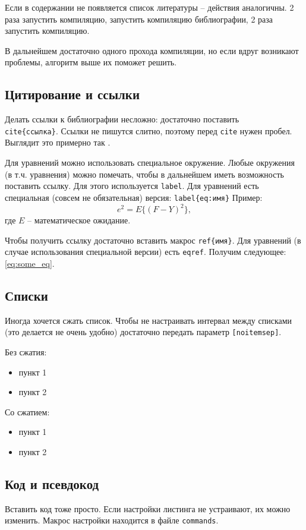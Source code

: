 Если в содержании не появляется список литературы -- действия аналогичны. 2 раза запустить компиляцию, запустить компиляцию библиографии, 2 раза запустить компиляцию.

В дальнейшем достаточно одного прохода компиляции, но если вдруг возникают проблемы, алгоритм выше их поможет решить.

\subsection{Цитирование и ссылки}
Делать ссылки к библиографии несложно: достаточно поставить \texttt{\\cite\{ссылка\}}. Ссылки не пишутся слитно, поэтому перед \texttt{cite} нужен пробел. Выглядит это примерно так \cite{test}.

Для уравнений можно использовать специальное окружение. Любые окружения (в т.ч. уравнения) можно помечать, чтобы в дальнейшем иметь возможность поставить ссылку. Для этого используется \texttt{label}. Для уравнений есть специальная (совсем не обязательная) версия: \texttt{label\{eq:имя\}} Пример:
\begin{equation}\label{eq:some_eq}
	e^2 = E\{(F - Y)^2\},
\end{equation}
где $E$ -- математическое ожидание.

Чтобы получить ссылку достаточно вставить макрос \texttt{ref\{имя\}}. Для уравнений (в случае использования специальной версии) есть \texttt{eqref}. Получим следующее: \eqref{eq:some_eq}.

\subsection{Списки}
Иногда хочется сжать список. Чтобы не настраивать интервал между списками (это делается не очень удобно) достаточно передать параметр \texttt{[noitemsep]}.

Без сжатия:
\begin{itemize}
    \item пункт 1
    \item пункт 2
\end{itemize}

Со сжатием:
\begin{itemize}[noitemsep]
    \item пункт 1
    \item пункт 2
\end{itemize}

\subsection{Код и псевдокод}
Вставить код тоже просто. Если настройки листинга не устраивают, их можно изменить. Макрос настройки находится в файле \texttt{commands}.

